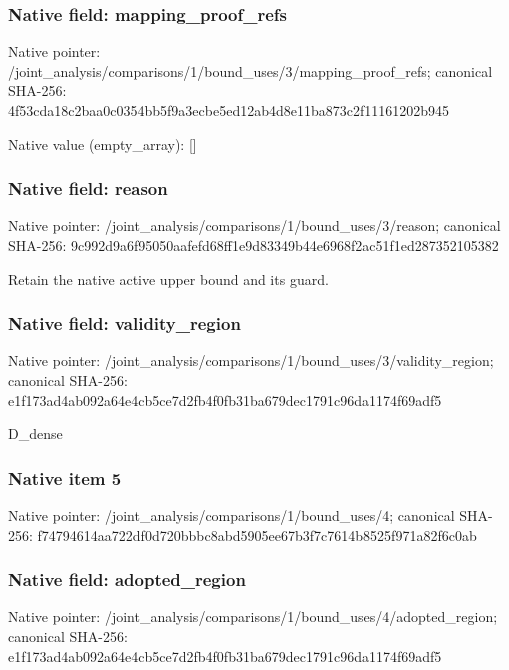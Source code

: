 \documentclass[10pt,a4paper]{article}
\begin{document}
\subsubsection{Native field: mapping\_\allowbreak{}proof\_\allowbreak{}refs}
Native pointer: /joint\_\allowbreak{}analysis/comparisons/1/bound\_\allowbreak{}uses/3/mapping\_\allowbreak{}proof\_\allowbreak{}refs; canonical SHA-256: 4f53cda18c2baa0c0354bb5f9a3ecbe5ed12ab4d8e11ba873c2f11161202b945

Native value (empty\_\allowbreak{}array): []

\subsubsection{Native field: reason}
Native pointer: /joint\_\allowbreak{}analysis/comparisons/1/bound\_\allowbreak{}uses/3/reason; canonical SHA-256: 9c992d9a6f95050aafefd68ff1e9d83349b44e6968f2ac51f1ed287352105382

\begingroup\raggedright\sloppy Retain the native active upper bound and its guard.\par\endgroup

\subsubsection{Native field: validity\_\allowbreak{}region}
Native pointer: /joint\_\allowbreak{}analysis/comparisons/1/bound\_\allowbreak{}uses/3/validity\_\allowbreak{}region; canonical SHA-256: e1f173ad4ab092a64e4cb5ce7d2fb4f0fb31ba679dec1791c96da1174f69adf5

\begingroup\raggedright\sloppy D\_\allowbreak{}dense\par\endgroup

\subsubsection{Native item 5}
Native pointer: /joint\_\allowbreak{}analysis/comparisons/1/bound\_\allowbreak{}uses/4; canonical SHA-256: f74794614aa722df0d720bbbc8abd5905ee67b3f7c7614b8525f971a82f6c0ab

\subsubsection{Native field: adopted\_\allowbreak{}region}
Native pointer: /joint\_\allowbreak{}analysis/comparisons/1/bound\_\allowbreak{}uses/4/adopted\_\allowbreak{}region; canonical SHA-256: e1f173ad4ab092a64e4cb5ce7d2fb4f0fb31ba679dec1791c96da1174f69adf5
\end{document}
